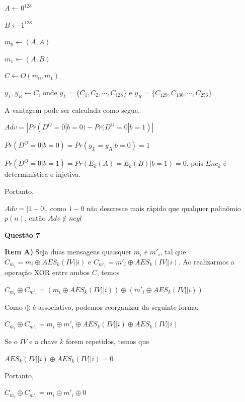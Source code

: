 \documentclass{article}
\begin{document}
        \begin{algorithm}[H]
            \caption{Distinguidor $D$}

            $A \leftarrow 0^{128}$

            $B \leftarrow 1^{128}$

            $m_0 \leftarrow (A,A)$

            $m_1 \leftarrow (A,B)$
            

            $C \leftarrow O(m_0,m_1)$

            $y_L, y_R \leftarrow C$, onde $y_L = \{C_1,C_2, \cdots, C_{128}\}$ e $y_R = \{C_{129},C_{130},\cdots, C_{256}\}$

        \end{algorithm}

    A vantagem pode ser calculada como segue.

    $Adv = |Pr(D^{O} = 0 | b = 0) - Pr(D^{O} = 0 | b = 1)|$

    $Pr(D^{O} = 0 | b = 0) = Pr(y_L = y_R| b = 0) = 1$

    $Pr(D^{O} = 0 | b = 1) = Pr(E_k(A) = E_k(B) | b = 1) = 0$, pois $Enc_k$ é determinística e injetiva.

    Portanto,

    $Adv = |1 - 0|$, como $1 - 0$ não descresce mais rápido que qualquer polinômio $p(n)$, então $Adv \notin negl$

\textbf{Questão 7}

\textbf{Item A)} 
    Seja duas mensagens quaisquer $m_i$ e $m'_i$, tal que $C_{m_i} = m_i \oplus AES_k(IV||i)$ e $C_{m'_i} = m'_i \oplus AES_k(IV||i)$. Ao realizarmos a operação XOR entre ambos $C$, temos

    $C_{m_i} \oplus C_{m'_i} = (m_i \oplus AES_k(IV||i)) \oplus (m'_i \oplus AES_k(IV||i))$

    Como $\oplus$ é associativo, podemos reorganizar da seguinte forma:

    $C_{m_i} \oplus C_{m'_i} = m_i \oplus m'_i \oplus AES_k(IV||i) \oplus AES_k(IV||i)$

    Se o $IV$ e a chave $k$ forem repetidos, temos que 

    $AES_k(IV||i) \oplus AES_k(IV||i) = 0$

    Portanto,

    $C_{m_i} \oplus C_{m'_i} = m_i \oplus m'_i \oplus 0$
\end{document}
